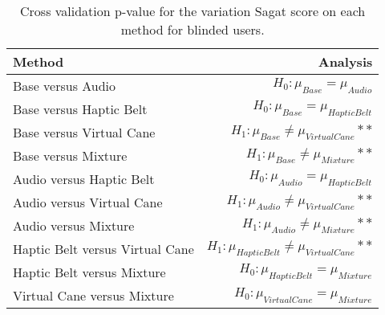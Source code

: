 
\begin{table}[!htb]
\centering
\caption{Cross validation p-value for the variation Sagat score on each method for blinded users.}
\label{tab:lsd_sagat_var}
\begin{tabular}{lr}
\toprule
                         Method &                                           Analysis \\
\midrule
              Base versus Audio &                   $H_0 : \mu_{Base} = \mu_{Audio}$ \\
        Base versus Haptic Belt &             $H_0 : \mu_{Base} = \mu_{Haptic Belt}$ \\
       Base versus Virtual Cane &        $H_1 : \mu_{Base} \ne \mu_{Virtual Cane}**$ \\
            Base versus Mixture &             $H_1 : \mu_{Base} \ne \mu_{Mixture}**$ \\
       Audio versus Haptic Belt &            $H_0 : \mu_{Audio} = \mu_{Haptic Belt}$ \\
      Audio versus Virtual Cane &       $H_1 : \mu_{Audio} \ne \mu_{Virtual Cane}**$ \\
           Audio versus Mixture &            $H_1 : \mu_{Audio} \ne \mu_{Mixture}**$ \\
Haptic Belt versus Virtual Cane & $H_1 : \mu_{Haptic Belt} \ne \mu_{Virtual Cane}**$ \\
     Haptic Belt versus Mixture &          $H_0 : \mu_{Haptic Belt} = \mu_{Mixture}$ \\
    Virtual Cane versus Mixture &         $H_0 : \mu_{Virtual Cane} = \mu_{Mixture}$ \\
\bottomrule
\end{tabular}
\end{table}

